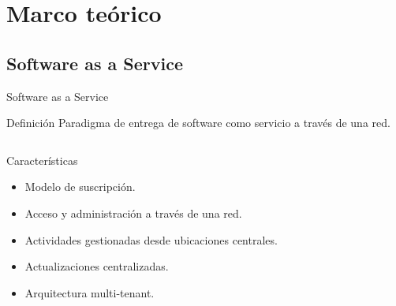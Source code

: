 \documentclass[10pt,xcolor=table ]{beamer}
\begin{document}
\section{Marco teórico}
\subsection{Software as a Service}
\begin{frame}{Software as a Service}
	\begin{alertblock}{Definición}
		Paradigma de entrega de software como servicio a través de una red.
	\end{alertblock}

	\begin{columns}[c,onlytextwidth]
		\begin{block}{Características}
			\begin{itemize}
	        	\item Modelo de suscripción.
	        	\item Acceso y administración a través de una red.
	        	\item Actividades gestionadas desde ubicaciones centrales.
	        	\item Actualizaciones centralizadas.
	      		\item Arquitectura multi-tenant.
	    	\end{itemize}
		\end{block}
		\begin{figure}[H]

\end{figure}
\end{columns}
\end{frame}
\end{document}
